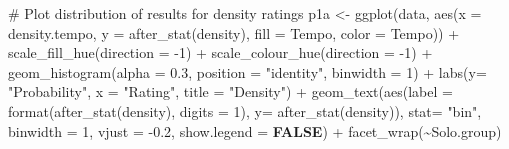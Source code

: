 \documentclass[
  bookmarksnumbered]{article}
\newenvironment{Shaded}{\begin{snugshade}}{\end{snugshade}}
\newcommand{\AttributeTok}[1]{\textcolor[rgb]{0.80,0.80,0.80}{#1}}
\newcommand{\CommentTok}[1]{\textcolor[rgb]{0.50,0.62,0.50}{#1}}
\newcommand{\ConstantTok}[1]{\textcolor[rgb]{0.86,0.64,0.64}{\textbf{#1}}}
\newcommand{\DecValTok}[1]{\textcolor[rgb]{0.86,0.86,0.80}{#1}}
\newcommand{\FloatTok}[1]{\textcolor[rgb]{0.75,0.75,0.82}{#1}}
\newcommand{\FunctionTok}[1]{\textcolor[rgb]{0.94,0.94,0.56}{#1}}
\newcommand{\NormalTok}[1]{\textcolor[rgb]{0.80,0.80,0.80}{#1}}
\newcommand{\OtherTok}[1]{\textcolor[rgb]{0.94,0.94,0.56}{#1}}
\newcommand{\SpecialCharTok}[1]{\textcolor[rgb]{0.86,0.64,0.64}{#1}}
\newcommand{\StringTok}[1]{\textcolor[rgb]{0.80,0.58,0.58}{#1}}
\begin{document}
\begin{Shaded}
\begin{Highlighting}[]
\CommentTok{\# Plot distribution of results for density ratings}
\NormalTok{p1a }\OtherTok{\textless{}{-}} \FunctionTok{ggplot}\NormalTok{(data, }\FunctionTok{aes}\NormalTok{(}\AttributeTok{x =}\NormalTok{ density.tempo, }\AttributeTok{y =} \FunctionTok{after\_stat}\NormalTok{(density),}
                       \AttributeTok{fill =}\NormalTok{ Tempo, }\AttributeTok{color =}\NormalTok{ Tempo)) }\SpecialCharTok{+}
  \FunctionTok{scale\_fill\_hue}\NormalTok{(}\AttributeTok{direction =} \SpecialCharTok{{-}}\DecValTok{1}\NormalTok{) }\SpecialCharTok{+} \FunctionTok{scale\_colour\_hue}\NormalTok{(}\AttributeTok{direction =} \SpecialCharTok{{-}}\DecValTok{1}\NormalTok{) }\SpecialCharTok{+}
  \FunctionTok{geom\_histogram}\NormalTok{(}\AttributeTok{alpha =} \FloatTok{0.3}\NormalTok{, }\AttributeTok{position =} \StringTok{"identity"}\NormalTok{, }\AttributeTok{binwidth =} \DecValTok{1}\NormalTok{) }\SpecialCharTok{+}
  \FunctionTok{labs}\NormalTok{(}\AttributeTok{y=} \StringTok{"Probability"}\NormalTok{, }\AttributeTok{x =} \StringTok{"Rating"}\NormalTok{, }\AttributeTok{title =} \StringTok{"Density"}\NormalTok{) }\SpecialCharTok{+}
  \FunctionTok{geom\_text}\NormalTok{(}\FunctionTok{aes}\NormalTok{(}\AttributeTok{label =} \FunctionTok{format}\NormalTok{(}\FunctionTok{after\_stat}\NormalTok{(density), }\AttributeTok{digits =} \DecValTok{1}\NormalTok{), }\AttributeTok{y=} \FunctionTok{after\_stat}\NormalTok{(density)), }
            \AttributeTok{stat=} \StringTok{"bin"}\NormalTok{, }\AttributeTok{binwidth =} \DecValTok{1}\NormalTok{, }
            \AttributeTok{vjust =} \SpecialCharTok{{-}}\FloatTok{0.2}\NormalTok{,}
            \AttributeTok{show.legend =} \ConstantTok{FALSE}\NormalTok{) }\SpecialCharTok{+}
  \FunctionTok{facet\_wrap}\NormalTok{(}\SpecialCharTok{\textasciitilde{}}\NormalTok{Solo.group)}


\end{Highlighting}
\end{Shaded}
\end{document}

